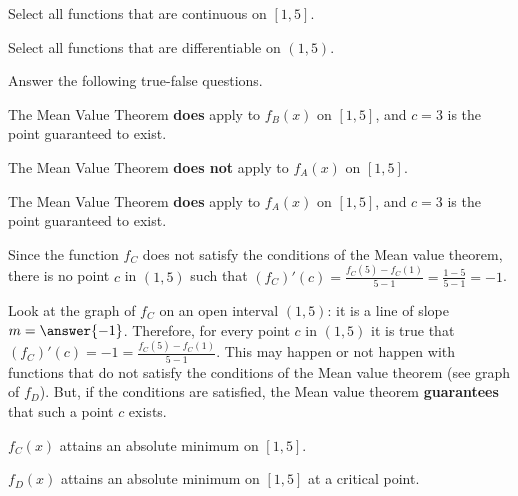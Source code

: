 \documentclass{ximera}
\begin{document}
\begin{exercise}
Select all functions that are continuous on $[1,5]$.
\begin{selectAll}
\end{selectAll}
\begin{exercise}
Select all functions that are differentiable on $(1,5)$.
\begin{selectAll}
\end{selectAll}
\begin{exercise}
Answer the following true-false questions.

The Mean Value Theorem \textbf{does} apply to $f_B(x)$ on $[1,5]$, and $c=3$ is the point guaranteed to exist.
\begin{multipleChoice}
\end{multipleChoice}

The Mean Value Theorem \textbf{does not} apply to $f_A(x)$ on $[1,5]$. 
\begin{multipleChoice}
\end{multipleChoice}

The Mean Value Theorem \textbf{does} apply to $f_A(x)$ on $[1,5]$, and $c=3$ is the point guaranteed to exist.
\begin{multipleChoice}
\end{multipleChoice}

Since the function $f_C$ does not satisfy the conditions of the Mean value theorem, there is no point $c$ in $(1,5)$ such that $(f_C)'(c)=\frac{f_C(5)-f_C(1)}{5-1}=\frac{1-5}{5-1}=-1$.
\begin{hint}
Look at the graph of $f_C$ on an open interval $(1,5)$: it is a line of slope $m=\answer{-1}$. Therefore, for every point $c$ in $(1,5)$ it is true that  $(f_C)'(c)=-1=\frac{f_C(5)-f_C(1)}{5-1}$. This may happen or not happen with functions that do not satisfy the conditions of the Mean value theorem (see graph of $f_D$). But, if the conditions are satisfied, the Mean value theorem \textbf{guarantees} that such a point $c$ exists.
\end{hint}
\begin{multipleChoice}
\end{multipleChoice}
$f_C(x)$ attains an absolute minimum on $[1,5]$.
\begin{multipleChoice}
\end{multipleChoice}

$f_D(x)$ attains an absolute minimum on $[1,5]$ at a critical point.
\begin{multipleChoice}
\end{multipleChoice}
\end{exercise}
\end{exercise}
\end{exercise}
\end{document}
